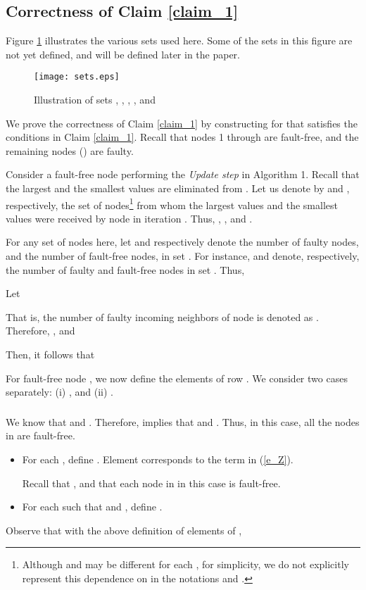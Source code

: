 \documentclass[letterpaper, 12pt]{article}
\begin{document}
\subsection{Correctness of Claim \ref{claim_1}}
\label{ss_claim_1}

Figure \ref{f_sets} illustrates the various sets used here.
Some of the sets in this figure are not yet defined, and will be defined
later in the paper.
\begin{figure}
\centering
\texttt{[image: sets.eps]}
\caption{Illustration of sets , , ,
,  and }
\label{f_sets}
\end{figure}



We prove the correctness of Claim \ref{claim_1} by constructing 
for  that satisfies the conditions in Claim \ref{claim_1}.
Recall that nodes 1 through  are fault-free, and the remaining
 nodes () are faulty.

Consider a fault-free node  performing the {\em Update step}
in Algorithm 1.
Recall that the largest  and the smallest  values are eliminated
from . Let us denote by  and , respectively, the set
of nodes\footnote{Although  and  may be different for each ,
for simplicity, we do not explicitly represent this dependence
on  in the notations  and .}  
from whom the largest  values and the smallest  values
were received by node  in iteration .
Thus,
, ,
and .


For any set of nodes  here, let  and  respectively
denote the number of faulty nodes, and the number of fault-free nodes, in set .
For instance,  and  denote, respectively, the number
of faulty and fault-free nodes in set .
Thus,

Let

That is, the number of faulty incoming neighbors of node  is denoted
as .
Therefore, ,
and




Then, it follows that



For fault-free node ,
we now define the elements of row .
We consider two cases separately: (i) ,
and (ii) . 

\subsubsection{}
\label{ss_1}

We know that  and .
Therefore,  implies that 
and . Thus, in this case, all the nodes in 
are fault-free.
\begin{itemize}
\item
For each 
, define .
Element  corresponds to the term  in (\ref{e_Z}).

Recall that , and that each node in 
in this case is fault-free.

\item 
For each  such that 
and , define .
\end{itemize}
Observe that with the above definition of elements of ,
\end{document}
